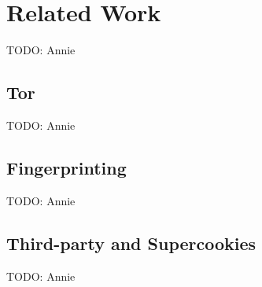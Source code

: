 \section{Related Work}
\label{sec:related}
TODO: Annie

\subsection{Tor}
TODO: Annie

\subsection{Fingerprinting}
TODO: Annie

\subsection{Third-party and Supercookies}
TODO: Annie
